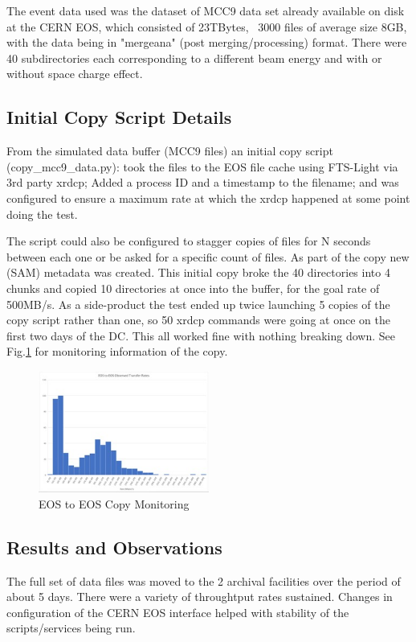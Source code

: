 \documentclass[pdftex,12pt,letter]{article}
\begin{document}
The event data used was the dataset of MCC9 data set already available on disk at the CERN EOS, which consisted of
23TBytes,  ~3000 files of average size 8GB, with the data being in  "mergeana" (post merging/processing)  format. There were 
40 subdirectories each corresponding to a different beam energy and with or without space charge effect.

\subsection{Initial Copy Script Details}
From the simulated data buffer (MCC9 files)  an initial copy script (copy\_mcc9\_data.py): took the files to the EOS file cache using FTS-Light via 3rd party xrdcp; Added a process ID and a timestamp to the filename; and was configured to ensure a maximum rate at which the xrdcp happened at some point doing the test. 

The script could also be configured to stagger copies of files for N seconds between each one or be asked for a specific  count of files. As part of the copy new (SAM) metadata was created. This initial copy broke the 40 directories into 4 chunks and copied 10 directories at once into the buffer, for the goal rate of 500MB/s. As a side-product the test ended up twice launching 5 copies of the copy script rather than one, so 50 xrdcp commands were going at once on the first two days of the DC. This all worked fine with nothing breaking down. See Fig.\ref{fig:EOStoEOS} for monitoring information of the copy. 


\begin{figure}[tbh]
  \centering
  \includegraphics[width=0.5\textwidth]{./ReportImages/EOStoEOS.jpg}
  \caption{EOS to EOS Copy Monitoring}
  \label{fig:EOStoEOS}
\end{figure}




\subsection{Results and Observations}
The full set of data files was moved to the 2 archival facilities over the period of about 5 days. There were a variety of throughtput rates sustained. Changes in configuration of the CERN EOS interface helped with stability of the scripts/services being run. 
\end{document}

